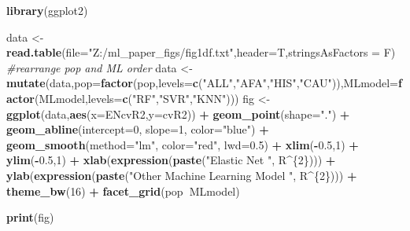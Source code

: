 \documentclass[]{article}
\newenvironment{Shaded}{\begin{snugshade}}{\end{snugshade}}
\newcommand{\KeywordTok}[1]{\textcolor[rgb]{0.13,0.29,0.53}{\textbf{#1}}}
\newcommand{\DataTypeTok}[1]{\textcolor[rgb]{0.13,0.29,0.53}{#1}}
\newcommand{\DecValTok}[1]{\textcolor[rgb]{0.00,0.00,0.81}{#1}}
\newcommand{\FloatTok}[1]{\textcolor[rgb]{0.00,0.00,0.81}{#1}}
\newcommand{\StringTok}[1]{\textcolor[rgb]{0.31,0.60,0.02}{#1}}
\newcommand{\CommentTok}[1]{\textcolor[rgb]{0.56,0.35,0.01}{\textit{#1}}}
\newcommand{\OperatorTok}[1]{\textcolor[rgb]{0.81,0.36,0.00}{\textbf{#1}}}
\newcommand{\NormalTok}[1]{#1}
\begin{document}
\begin{Shaded}
\begin{Highlighting}[]
\KeywordTok{library}\NormalTok{(ggplot2)}

\NormalTok{data <-}\StringTok{ }\KeywordTok{read.table}\NormalTok{(}\DataTypeTok{file=}\StringTok{"Z:/ml_paper_figs/fig1df.txt"}\NormalTok{,}\DataTypeTok{header=}\NormalTok{T,}\DataTypeTok{stringsAsFactors =}\NormalTok{ F)}
\CommentTok{#rearrange pop and ML order}
\NormalTok{data <-}\StringTok{ }\KeywordTok{mutate}\NormalTok{(data,}\DataTypeTok{pop=}\KeywordTok{factor}\NormalTok{(pop,}\DataTypeTok{levels=}\KeywordTok{c}\NormalTok{(}\StringTok{"ALL"}\NormalTok{,}\StringTok{"AFA"}\NormalTok{,}\StringTok{"HIS"}\NormalTok{,}\StringTok{"CAU"}\NormalTok{)),}\DataTypeTok{MLmodel=}\KeywordTok{factor}\NormalTok{(MLmodel,}\DataTypeTok{levels=}\KeywordTok{c}\NormalTok{(}\StringTok{"RF"}\NormalTok{,}\StringTok{"SVR"}\NormalTok{,}\StringTok{"KNN"}\NormalTok{)))}
\NormalTok{fig <-}\StringTok{ }\KeywordTok{ggplot}\NormalTok{(data,}\KeywordTok{aes}\NormalTok{(}\DataTypeTok{x=}\NormalTok{ENcvR2,}\DataTypeTok{y=}\NormalTok{cvR2)) }\OperatorTok{+}\StringTok{ }\KeywordTok{geom_point}\NormalTok{(}\DataTypeTok{shape=}\StringTok{"."}\NormalTok{) }\OperatorTok{+}\StringTok{ }\KeywordTok{geom_abline}\NormalTok{(}\DataTypeTok{intercept=}\DecValTok{0}\NormalTok{, }\DataTypeTok{slope=}\DecValTok{1}\NormalTok{, }\DataTypeTok{color=}\StringTok{"blue"}\NormalTok{) }\OperatorTok{+}
\StringTok{  }\KeywordTok{geom_smooth}\NormalTok{(}\DataTypeTok{method=}\StringTok{"lm"}\NormalTok{, }\DataTypeTok{color=}\StringTok{"red"}\NormalTok{, }\DataTypeTok{lwd=}\FloatTok{0.5}\NormalTok{) }\OperatorTok{+}\StringTok{ }\KeywordTok{xlim}\NormalTok{(}\OperatorTok{-}\FloatTok{0.5}\NormalTok{,}\DecValTok{1}\NormalTok{) }\OperatorTok{+}\StringTok{ }\KeywordTok{ylim}\NormalTok{(}\OperatorTok{-}\FloatTok{0.5}\NormalTok{,}\DecValTok{1}\NormalTok{) }\OperatorTok{+}\StringTok{ }
\StringTok{  }\KeywordTok{xlab}\NormalTok{(}\KeywordTok{expression}\NormalTok{(}\KeywordTok{paste}\NormalTok{(}\StringTok{"Elastic Net "}\NormalTok{, R}\OperatorTok{^}\NormalTok{\{}\DecValTok{2}\NormalTok{\}))) }\OperatorTok{+}\StringTok{ }\KeywordTok{ylab}\NormalTok{(}\KeywordTok{expression}\NormalTok{(}\KeywordTok{paste}\NormalTok{(}\StringTok{"Other Machine Learning Model "}\NormalTok{, R}\OperatorTok{^}\NormalTok{\{}\DecValTok{2}\NormalTok{\}))) }\OperatorTok{+}
\StringTok{  }\KeywordTok{theme_bw}\NormalTok{(}\DecValTok{16}\NormalTok{) }\OperatorTok{+}\StringTok{ }\KeywordTok{facet_grid}\NormalTok{(pop}\OperatorTok{~}\NormalTok{MLmodel) }

\KeywordTok{print}\NormalTok{(fig)}
\end{Highlighting}
\end{Shaded}
\end{document}

